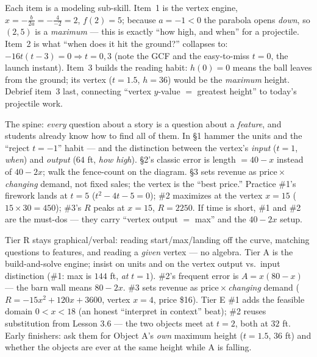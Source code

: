 \documentclass[10pt]{article}
\begin{document}
\begin{teachernote}[Warm-Up]
Each item is a modeling sub-skill. Item~1 is the vertex engine, $x=-\frac{b}{2a}=-\frac{4}{-2}=2$, $f(2)=5$; because
$a=-1<0$ the parabola opens \emph{down}, so $(2,5)$ is a \emph{maximum} --- this is exactly ``how high, and when'' for
a projectile. Item~2 is what ``when does it hit the ground?'' collapses to: $-16t(t-3)=0\Rightarrow t=0,3$ (note the
GCF and the easy-to-miss $t=0$, the launch instant). Item~3 builds the reading habit: $h(0)=0$ means the ball leaves
from the ground; its vertex ($t=1.5$, $h=36$) would be the \emph{maximum} height. Debrief item~3 last, connecting
``vertex $y$-value $=$ greatest height'' to today's projectile work.
\end{teachernote}

\begin{teachernote}
The spine: \emph{every} question about a story is a question about a \emph{feature}, and students already know how to
find all of them. In \S1 hammer the units and the ``reject $t=-1$'' habit --- and the distinction between the vertex's
\emph{input} ($t=1$, \emph{when}) and \emph{output} ($64$ ft, \emph{how high}). \S2's classic error is length $=40-x$
instead of $40-2x$; walk the fence-count on the diagram. \S3 sets revenue as price\,$\times$\,\emph{changing} demand,
not fixed sales; the vertex is the ``best price.'' Practice \#1's firework lands at $t=5$ ($t^2-4t-5=0$); \#2 maximizes
at the vertex $x=15$ ($15\times30=450$); \#3's $R$ peaks at $x=15$, $R=2250$. If time is short, \#1 and \#2 are the
must-dos --- they carry ``vertex output $=$ max'' and the $40-2x$ setup.
\end{teachernote}

\begin{teachernote}
Tier R stays graphical/verbal: reading start/max/landing off the curve, matching questions to features, and reading a
\emph{given} vertex --- no algebra. Tier A is the build-and-solve engine; insist on units and on the vertex output vs.\
input distinction (\#1: max is $144$ ft, \emph{at} $t=1$). \#2's frequent error is $A=x(80-x)$ --- the barn wall means
$80-2x$. \#3 sets revenue as price\,$\times$\,\emph{changing} demand ($R=-15x^2+120x+3600$, vertex $x=4$, price \$16).
Tier E \#1 adds the feasible domain $0<x<18$ (an honest ``interpret in context'' beat); \#2 reuses substitution from
Lesson 3.6 --- the two objects meet at $t=2$, both at $32$ ft. Early finishers: ask them for Object A's \emph{own}
maximum height ($t=1.5$, $36$ ft) and whether the objects are ever at the same height while A is falling.
\end{teachernote}
\end{document}
